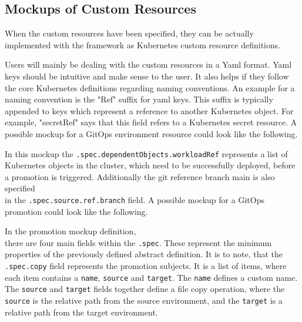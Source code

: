 \subsection{Mockups of Custom Resources}
\label{prototype:design:mockups-custom-resources}


When the custom resources have been specified,
they can be actually implemented with the framework
as Kubernetes custom resource definitions.

Users will mainly be dealing with the custom resources in a Yaml format.
Yaml keys should be intuitive and make sense to the user.
It also helps if they follow the core Kubernetes definitions regarding naming conventions.
An example for a naming convention is the "Ref" suffix for yaml keys.
This suffix is typically appended to keys which represent a reference to another Kubernetes
object.
For example, "secretRef" says that this field refers to a Kubernetes secret resource.
A possible mockup for a GitOps environment resource
could look like the following.



In this mockup the \lstinline|.spec.dependentObjects.workloadRef|
represents a list of Kubernetes objects in the cluster,
which need to be successfully deployed,
before a promotion is triggered.
Additionally the git reference branch main is also specified \\
in the \lstinline|.spec.source.ref.branch| field.
A possible mockup for a GitOps promotion 
could look like the following.



In the promotion mockup definition,\\
there are four main fields within the \lstinline|.spec|.
These represent the minimum properties of the previously defined abstract definition.
It is to note, that
the \lstinline|.spec.copy| field represents the promotion subjects.
It is a list of items, where each item contains
a \lstinline|name|, \lstinline|source| and \lstinline|target|.
The \lstinline|name| defines a custom name.
The \lstinline|source| and \lstinline|target| fields together define a
file copy operation,
where the \lstinline|source| is the relative path from the source environment,
and the \lstinline|target| is a relative path from the target environment.

